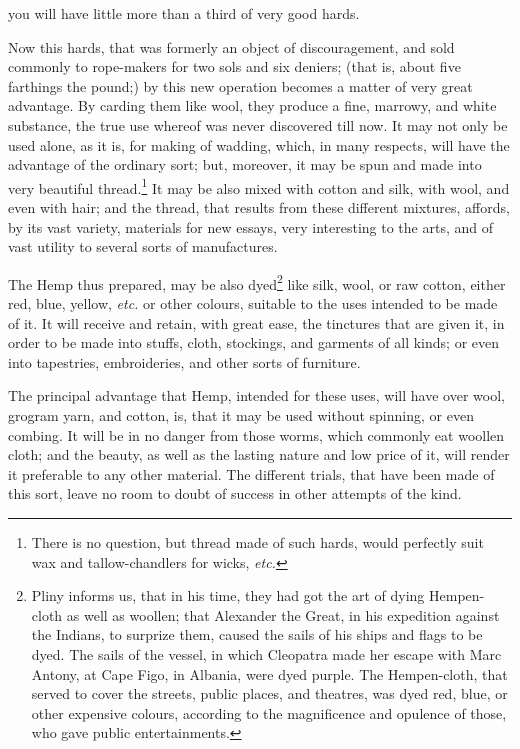 \documentclass[a4paper, 11pt, oneside, polutonikogreek, english]{article}
\begin{document}
you will have little more than a third of very good hards.

Now this hards, that was formerly an object of discouragement, and sold commonly to rope-makers for two sols and six deniers; (that is, about five farthings the pound;) by this new operation becomes a matter of very great advantage. By carding them like wool, they produce a fine, marrowy, and white substance, the true use whereof was never discovered till now. It may not only be used alone, as it is, for making of wadding, which, in many respects, will have the advantage of the ordinary sort; but, moreover, it may be spun and made into very beautiful thread.\footnote{There is no question, but thread made of such hards, would perfectly suit wax and tallow-chandlers for wicks, \emph{etc.}} It may be also mixed with cotton and silk, with wool, and even with hair; and the thread, that results from these different mixtures, affords, by its vast variety, materials for new essays, very interesting to the arts, and of vast utility to several sorts of manufactures.

The Hemp thus prepared, may be also dyed\footnote{Pliny informs us, that in his time, they had got the art of dying Hempen-cloth as well as woollen; that Alexander the Great, in his expedition against the Indians, to surprize them, caused the sails of his ships and flags to be dyed. The sails of the vessel, in which Cleopatra made her escape with Marc Antony, at Cape Figo, in Albania, were dyed purple. The Hempen-cloth, that served to cover the streets, public places, and theatres, was dyed red, blue, or other expensive colours, according to the magnificence and opulence of those, who gave public entertainments.} like silk, wool, or raw cotton, either red, blue, yellow, \emph{etc.} or other colours, suitable to the uses intended to be made of it. It will receive and retain, with great ease, the tinctures that are given it, in order to be made into stuffs, cloth, stockings, and garments of all kinds; or even into tapestries, embroideries, and other sorts of furniture.

The principal advantage that Hemp, intended for these uses, will have over wool, grogram yarn, and cotton, is, that it may be used without spinning, or even combing. It will be in no danger from those worms, which commonly eat woollen cloth; and the beauty, as well as the lasting nature and low price of it, will render it preferable to any other material. The different trials, that have been made of this sort, leave no room to doubt of success in other attempts of the kind.
\end{document}
